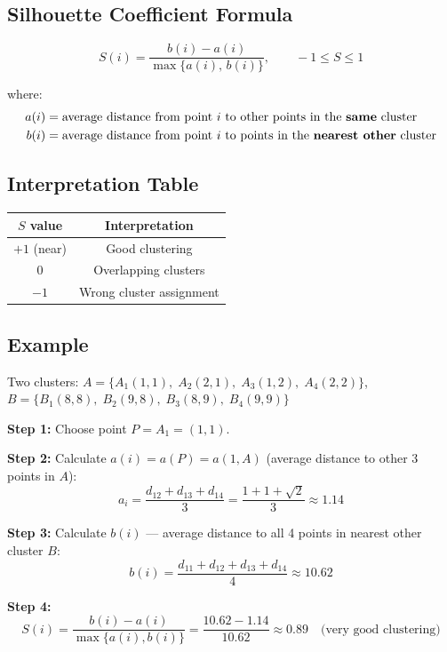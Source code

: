 \documentclass[12pt,a4paper]{article}
\begin{document}
\subsection{Silhouette Coefficient Formula}

\[
\boxed{S(i) = \frac{b(i) - a(i)}{\max\{a(i),\, b(i)\}}, \qquad -1 \leq S \leq 1}
\]

where:
\begin{align*}
a(i) &= \text{average distance from point } i \text{ to other points in the \textbf{same} cluster} \\
b(i) &= \text{average distance from point } i \text{ to points in the \textbf{nearest other} cluster}
\end{align*}

\subsection{Interpretation Table}

\begin{center}
\begin{tabular}{cc}
\toprule
$S$ value & Interpretation \\
\midrule
$+1$ (near) & Good clustering \\
$0$         & Overlapping clusters \\
$-1$        & Wrong cluster assignment \\
\bottomrule
\end{tabular}
\end{center}

\subsection{Example}

\begin{examplebox}
Two clusters: $A = \{A_1(1,1),\; A_2(2,1),\; A_3(1,2),\; A_4(2,2)\}$,\quad $B = \{B_1(8,8),\; B_2(9,8),\; B_3(8,9),\; B_4(9,9)\}$

\textbf{Step 1:} Choose point $P = A_1 = (1,1)$.

\textbf{Step 2:} Calculate $a(i) = a(P) = a(1,A)$ (average distance to other 3 points in $A$):
\[
a_i = \frac{d_{12} + d_{13} + d_{14}}{3} = \frac{1 + 1 + \sqrt{2}}{3} \approx 1.14
\]

\textbf{Step 3:} Calculate $b(i)$ --- average distance to all 4 points in nearest other cluster $B$:
\[
b(i) = \frac{d_{11}+d_{12}+d_{13}+d_{14}}{4} \approx 10.62
\]

\textbf{Step 4:}
\[
S(i) = \frac{b(i) - a(i)}{\max\{a(i), b(i)\}} = \frac{10.62 - 1.14}{10.62} \approx 0.89 \quad \text{(very good clustering)}
\]
\end{examplebox}
\end{document}
